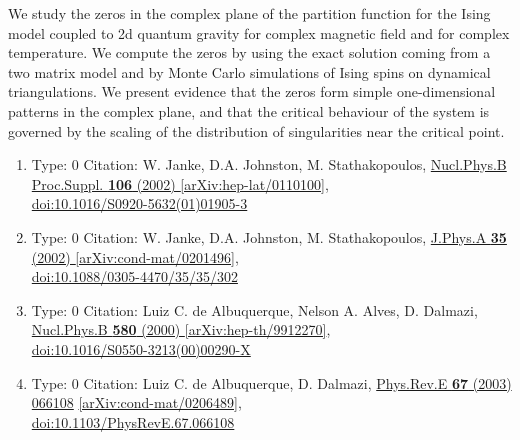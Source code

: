 \documentclass[a4paper,10pt]{article}
\begin{document}
\begin{enumerate}
We study the zeros in the complex plane of the partition function for the Ising model coupled to 2d quantum gravity for complex magnetic field and for complex temperature. We compute the zeros by using the exact solution coming from a two matrix model and by Monte Carlo simulations of Ising spins on dynamical triangulations. We present evidence that the zeros form simple one-dimensional patterns in the complex plane, and that the critical behaviour of the system is governed by the scaling of the distribution of singularities near the critical point.
\begin{enumerate}
  \item Type: 0 Citation: W. Janke, D.A. Johnston, M. Stathakopoulos, \href{https://www.doi.org/10.1016/S0920-5632(01)01905-3}{Nucl.Phys.B Proc.Suppl. {\bf 106} (2002) }  \href{https://arxiv.org/abs/hep-lat/0110100}{[arXiv:hep-lat/0110100]},\\\href{https://www.doi.org/10.1016/S0920-5632(01)01905-3}{doi:10.1016/S0920-5632(01)01905-3}
  \item Type: 0 Citation: W. Janke, D.A. Johnston, M. Stathakopoulos, \href{https://www.doi.org/10.1088/0305-4470/35/35/302}{J.Phys.A {\bf 35} (2002) }  \href{https://arxiv.org/abs/cond-mat/0201496}{[arXiv:cond-mat/0201496]},\\\href{https://www.doi.org/10.1088/0305-4470/35/35/302}{doi:10.1088/0305-4470/35/35/302}
  \item Type: 0 Citation: Luiz C. de Albuquerque, Nelson A. Alves, D. Dalmazi, \href{https://www.doi.org/10.1016/S0550-3213(00)00290-X}{Nucl.Phys.B {\bf 580} (2000) }  \href{https://arxiv.org/abs/hep-th/9912270}{[arXiv:hep-th/9912270]},\\\href{https://www.doi.org/10.1016/S0550-3213(00)00290-X}{doi:10.1016/S0550-3213(00)00290-X}
  \item Type: 0 Citation: Luiz C. de Albuquerque, D. Dalmazi, \href{https://www.doi.org/10.1103/PhysRevE.67.066108}{Phys.Rev.E {\bf 67} (2003) 066108}  \href{https://arxiv.org/abs/cond-mat/0206489}{[arXiv:cond-mat/0206489]},\\\href{https://www.doi.org/10.1103/PhysRevE.67.066108}{doi:10.1103/PhysRevE.67.066108}

\end{enumerate}
\end{enumerate}
\end{document}
